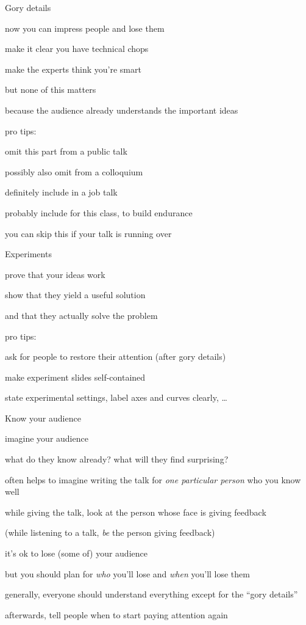 \documentclass[presentation,xcolor={usenames,dvipsnames}]{beamer}
\begin{document}
\begin{frame}{Gory details}

\bit
\item now you can impress people and lose them
\item make it clear you have technical chops
\item make the experts think you're smart
\item but none of this matters
\item because the audience already understands the important ideas
\eit

pro tips:
\bit
\item omit this part from a public talk
\item possibly also omit from a colloquium
\item definitely include in a job talk
\item probably include for this class, to build endurance
\item you can skip this if your talk is running over
\eit

\end{frame}

\begin{frame}{Experiments}

\bit
\item prove that your ideas work
\item show that they yield a useful solution
\item and that they actually solve the problem
\eit

pro tips:
\bit
\item ask for people to restore their attention (after gory details)
\item make experiment slides self-contained
\bit
\item state experimental settings, label axes and curves clearly, \ldots
\eit
\eit

\end{frame}

\begin{frame}{Know your audience}

\bit
\item imagine your audience
\bit
\item what do they know already? what will they find surprising?
\item often helps to imagine writing the talk for \emph{one particular person} who you know well
\item while giving the talk, look at the person whose face is giving feedback
\item (while listening to a talk, \emph{be} the person giving feedback)
\eit

\item it's ok to lose (some of) your audience
\bit
\item but you should plan for \emph{who} you'll lose and \emph{when} you'll lose them
\item generally, everyone should understand everything except for the ``gory details''
\item afterwards, tell people when to start paying attention again
\eit

\eit

\end{frame}
\end{document}
